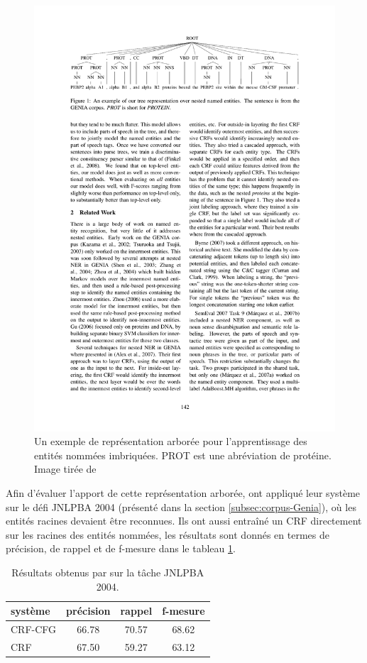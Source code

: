 \documentclass[12pt,a4paper,times,twoside,openright]{report}
\begin{document}
\begin{figure}[ht!]
    \includegraphics[scale=1.0]{images/finkel/pos+nn}
    \caption{Un exemple de représentation arborée pour l'apprentissage des entités nommées imbriquées. PROT est une abréviation de protéine. Image tirée de \citet{finkel2009b}}
    \label{fig:pos+nn-genia}
\end{figure}

Afin d'évaluer l'apport de cette représentation arborée, \citet{finkel2009b} ont appliqué leur système sur le défi JNLPBA 2004 (présenté dans la section \ref{subsec:corpus-Genia}), où les entités racines devaient être reconnues. Ils ont aussi entraîné un CRF directement sur les racines des entités nommées, les résultats sont donnés en termes de précision, de rappel et de f-mesure dans le tableau \ref{tab:finkel-systems-comparisons}.

\begin{table}[ht!]
\centering
\begin{tabular}{|l|ccc|}
\hline
système & précision & rappel & f-mesure \\
\hline
CRF-CFG & 66.78 & 70.57 & 68.62 \\
CRF     & 67.50 & 59.27 & 63.12 \\
\hline
\end{tabular}
\caption{Résultats obtenus par \citet{finkel2009b} sur la tâche JNLPBA 2004.}
\label{tab:finkel-systems-comparisons}
\end{table}
\end{document}
